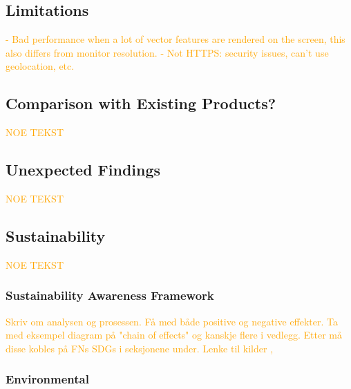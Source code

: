 \subsection{Limitations}


\textcolor{orange}{- Bad performance when a lot of vector features are rendered on the screen, this also differs from monitor resolution. - Not HTTPS: security issues, can't use geolocation, etc.}

\subsection{Comparison with Existing Products?}

\textcolor{orange}{NOE TEKST}

\subsection{Unexpected Findings} %

\textcolor{orange}{NOE TEKST}

\subsection{Sustainability} %

\textcolor{orange}{NOE TEKST}

\subsubsection{Sustainability Awareness Framework}

\textcolor{orange}{Skriv om analysen og prosessen. Få med både positive og negative effekter. Ta med eksempel diagram på "chain of effects" og kanskje flere i vedlegg. Etter må disse kobles på FNs SDGs i seksjonene under. Lenke til kilder \cite{ntnususaf}, \cite{linkopingssusaf}}

\subsubsection{Environmental}

